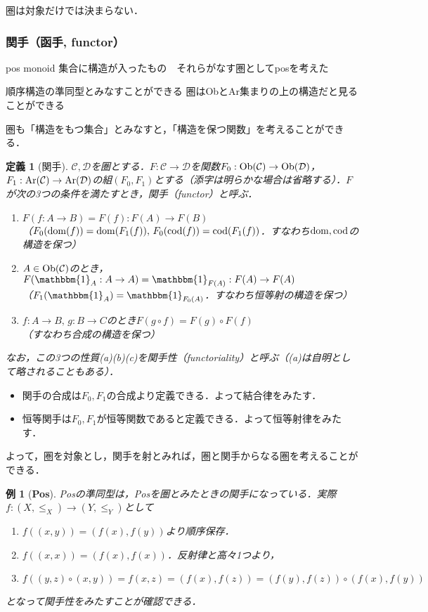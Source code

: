 \documentclass[dvipdfmx,a4j,10pt]{jsarticle}
\theoremstyle{mystyle1}
\theoremstyle{mystyle2}
\newtheorem{dfn*}{定義}
\newtheorem{example}{例}
\renewcommand{\labelenumi}{\ensuremath{\blacksquare}}
\renewcommand{\labelenumi}{(\arabic{enumi})}%
\newcommand{\Ob}{{\rm Ob}}
\newcommand{\Ar}{{\rm Ar}}
\newcommand{\dom}{{\rm dom}}
\newcommand{\cod}{{\rm cod}}
\begin{document}
圏は対象だけでは決まらない．

\subsubsection{関手（函手, functor）}
pos monoid 集合に構造が入ったもの　それらがなす圏としてposを考えた

順序構造の準同型とみなすことができる
圏はObとAr集まりの上の構造だと見ることができる

圏も「構造をもつ集合」とみなすと，「構造を保つ関数」を考えることができる．

\begin{dfn*}[関手]
    $\mathcal{C},\mathcal{D}$を圏とする．$F:\mathcal{C}\to\mathcal{D}$を関数$F_0:\Ob(\mathcal{C})\to\Ob(\mathcal{D})$，$F_1:\Ar(\mathcal{C})\to\Ar(\mathcal{D})$の組$(F_0,F_1)$とする（添字は明らかな場合は省略する）．$F$が次の3つの条件を満たすとき，関手（functor）と呼ぶ．
    \begin{enumerate}\renewcommand{\labelenumi}{(\alph{enumi})}
        \item $F(f:A\to B)=F(f):F(A)\to F(B)$\\
              （$F_0(\dom(f))=\dom(F_1(f)),\,F_0(\cod(f))=\cod(F_1(f))$．すなわち$\dom,\cod$の構造を保つ）
        \item $A\in\Ob(\mathcal{C})$のとき，$F(\mathbbm{1}_A:A\to A)=\mathbbm{1}_{F(A)}:F(A)\to F(A)$\\
              （$F_1(\mathbbm{1}_A)=\mathbbm{1}_{F_0(A)}$．すなわち恒等射の構造を保つ）
        \item $f:A\to B,\, g:B\to C$のとき$F(g\circ f)=F(g)\circ F(f)$\\
              （すなわち合成の構造を保つ）
    \end{enumerate}
    なお，この3つの性質(a)(b)(c)を関手性（functoriality）と呼ぶ（(a)は自明として略されることもある）．
\end{dfn*}

\begin{itemize}
    \item 関手の合成は$F_0,F_1$の合成より定義できる．よって結合律をみたす．
    \item 恒等関手は$F_0,F_1$が恒等関数であると定義できる．よって恒等射律をみたす．
\end{itemize}
よって，圏を対象とし，関手を射とみれば，圏と関手からなる圏を考えることができる．

\begin{example}[\textbf{Pos}]
    Posの準同型は，Posを圏とみたときの関手になっている．実際$f:(X,\leq_X)\to (Y,\leq_Y)$として
    \begin{enumerate}\renewcommand{\labelenumi}{(\alph{enumi})}
        \item $f((x,y))=(f(x),f(y))$より順序保存．
        \item $f((x,x))=(f(x),f(x))$．反射律と高々1つより，
        \item $f((y,z)\circ (x,y))=f(x,z)=(f(x),f(z))=(f(y),f(z))\circ (f(x),f(y))$
    \end{enumerate}
    となって関手性をみたすことが確認できる．
\end{example}
\end{document}
